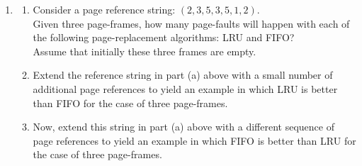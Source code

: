\documentclass[11pt]{article}
\begin{document}
\begin{enumerate}
\begin{enumerate}
    \end{enumerate}

  \newpage
  \item \begin{enumerate}
      \item Consider a page reference string: \((2, 3, 5, 3, 5, 1, 2)\). \\
      Given three page-frames, how many page-faults will happen with each of the following page-replacement algorithms: LRU and FIFO? \\
      Assume that initially these three frames are empty.

      \item Extend the reference string in part (a) above with a small number of additional page references to yield an example in which LRU is better than FIFO for the case of three page-frames.

      \item Now, extend this string in part (a) above with a different sequence of page references to yield an example in which FIFO is better than LRU for the case of three page-frames.
    \end{enumerate}


\end{enumerate}
\end{document}
